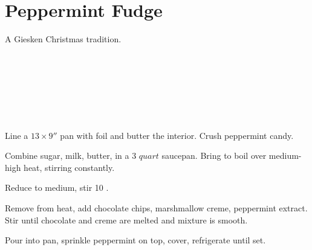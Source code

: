 \section{
    Peppermint Fudge
}

\begin{recipestats}[
        servings=60 squares,
        preptime=15 \minute,
        bakingtime=30 \minute,
        source=Cookie Swap 2003,
    ]
\end{recipestats}

\begin{recipeabstract}
    A Giesken Christmas tradition.
\end{recipeabstract}

\begin{ingredientcolumns}
    \begin{ingredientblock}
        \\
        \\
        \\
    \end{ingredientblock}
    \begin{ingredientblock}
        \\
        \\
    \end{ingredientblock}
\end{ingredientcolumns}

\pagebreak[1]
\begin{preparation}
\item Line a $13\times9''$ pan with foil and butter the interior.
    Crush peppermint candy.

\item Combine sugar, milk, butter, in a $3$ $quart$ saucepan.
    Bring to boil over medium-high heat, stirring constantly.

\item Reduce to medium, stir 10 \minute.

\item Remove from heat, add chocolate chips, marshmallow creme, peppermint extract.
    Stir until chocolate and creme are melted and mixture is smooth.

\item Pour into pan, sprinkle peppermint on top, cover, refrigerate until set.
\end{preparation}

\recipeend%
